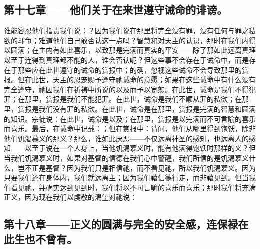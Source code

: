 
\subsection{第十七章——他们关于在来世遵守诫命的诽谤。}

谁能容忍他们指责我们说：？因为我们说在那里将完全没有罪，没有任何与罪之私欲的斗争；难道他们自己敢否认这一点吗？智慧和对天主的认识，那时在我们内得以圆满；在主内有如此喜乐，以致那是完满而真实的平安——除了那如此远离真理以至于连得到真理都不能的人，谁会否认呢？但这些事不会存在于诫命中，而是存在于那些应在此世遵守的诫命的赏报中；的确，忽视这些诫命不会导致那里的赏报。但在此世，天主的恩宠赐予遵守祂诫命的意愿；如果在这些诫命中有什么没有完全遵守，祂因我们在祈祷中所说的以及而予以宽恕。在此世，诫命是我们不得犯罪；在那里，赏报是我们不能犯罪。在此世，诫命是我们不顺从罪的私欲；在那里，赏报是我们没有罪的私欲。在此世，诫命是在那里，赏报是完满的智慧和圆满的知识。宗徒说：在此世，诫命是以及；在那里，赏报是以完满而不可言喻的喜乐而喜乐。最后，在诫命中记载：；但在赏报中：请问，他们从哪里得到饱饫，除非他们饥渴慕义的那义？那么，谁如此厌恶——不仅远离神圣的感知，也远离人的感知——以至于说在一个人身上，当他饥渴慕义时，能有他满得饱饫时那样的义？但当我们饥渴慕义时，如果对基督的信德在我们心中警醒，我们所信的是饥渴慕义什么，岂不正是基督？因为我们只是相信祂，而不看见祂，所以我们饥渴慕义。因为只要我们还在身体内，我们就远离主；因为我们藉信德行走，而非藉见到。但当我们看见祂，并确实达到见到时，我们将以不可言喻的喜乐而喜乐；那时我们将充满正义，因为现在我们以虔敬的渴望对祂说：\par


\subsection{第十八章——正义的圆满与完全的安全感，连保禄在此生也不曾有。}

